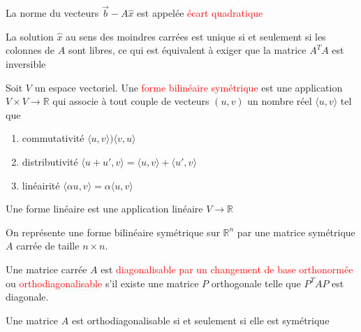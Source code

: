     \begin{definition}
        La norme du vecteurs $\vec{b}-A\hat{x}$ est appelée \textcolor{red}{écart quadratique}
    \end{definition}
    \begin{theoreme}
        La solution $\hat{x}$ au sens des moindres carrées est unique si et seulement si les colonnes de $A$ sont libres, ce qui est équivalent à exiger que la matrice $A^TA$ est inversible
    \end{theoreme}
            \begin{deinition}
                Soit $V$ un espace vectoriel. Une \textcolor{red}{forme bilinéaire symétrique} est une application $V \times V \to \mathbb{R}$ qui associe à tout couple de vecteurs $(u, v)$ un nombre réel $\langle u, v \rangle$ tel que
                \begin{enumerate}
                    \item commutativité $\langle u, v \rangle ) \langle v, u \rangle$
                    \item distributivité $\langle u + u', v \rangle = \langle u, v \rangle + \langle u' , v \rangle$
                    \item linéairité $\langle \alpha u, v \rangle = \alpha \langle u, v \rangle$
                \end{enumerate}
                \begin{framedremark}
                    Une forme linéaire est une application linéaire $V \to \mathbb{R}$
                \end{framedremark}
            \end{deinition}
                \begin{theoreme}
                    On représente une forme bilinéaire symétrique sur $\mathbb{R}^n$ par une matrice symétrique $A$ carrée de taille $n \times n$. 
                \end{theoreme}
            \begin{definition}
                Une matrice carrée $A$ est \textcolor{red}{diagonalisable par un changement de base orthonormée} ou \textcolor{red}{orthodiagonalisable} s'il existe une matrice $P$ orthogonale telle que $P^TAP$ est diagonale.
            \end{definition}
            \begin{theoreme}
                Une matrice $A$ est orthodiagonalisable si et seulement si elle est symétrique
            \end{theoreme}
